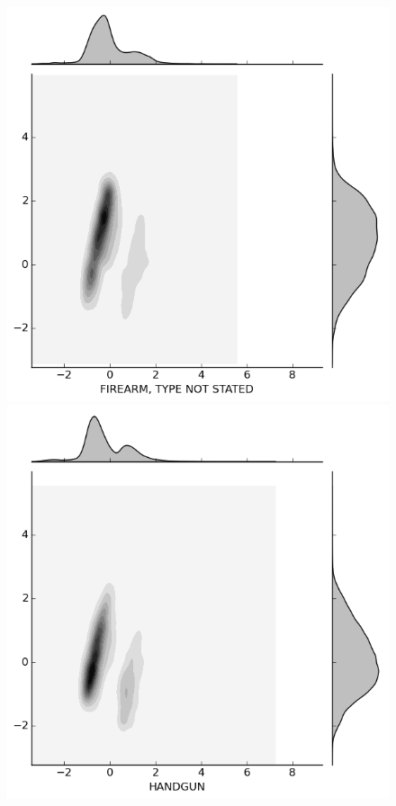 \documentclass{evanarticle}
\begin{document}
\begin{figure}[H]
\begin{minipage}[b]{0.20\linewidth}
  \end{minipage}
  \quad
  \begin{minipage}[b]{0.20\linewidth}
    \includegraphics[width=\linewidth]{images/weapon/FIREARM_TYPE_NOT_STATED.png}
  \end{minipage}
  \quad
  \begin{minipage}[b]{0.20\linewidth}
    \includegraphics[width=\linewidth]{images/weapon/HANDGUN.png}
  \end{minipage}


\end{figure}
\end{document}
